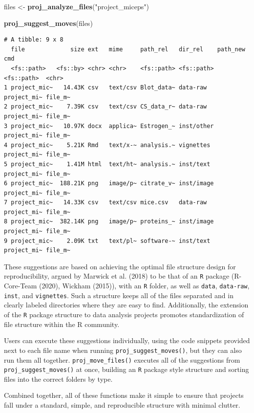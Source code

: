 \documentclass[12pt,twoside]{reedthesis}
\newenvironment{Shaded}{\begin{snugshade}}{\end{snugshade}}
\newcommand{\KeywordTok}[1]{\textcolor[rgb]{0.13,0.29,0.53}{\textbf{#1}}}
\newcommand{\StringTok}[1]{\textcolor[rgb]{0.31,0.60,0.02}{#1}}
\newcommand{\NormalTok}[1]{#1}
\begin{document}
\footnotesize
\begin{Shaded}
\begin{Highlighting}[]
\NormalTok{files <-}\StringTok{ }\KeywordTok{proj_analyze_files}\NormalTok{(}\StringTok{"project_miceps"}\NormalTok{)}

\KeywordTok{proj_suggest_moves}\NormalTok{(files)}
\end{Highlighting}
\end{Shaded}
\begin{verbatim}
# A tibble: 9 x 8
  file             size ext   mime     path_rel   dir_rel    path_new    cmd    
  <fs::path>   <fs::by> <chr> <chr>    <fs::path> <fs::path> <fs::path>  <chr>  
1 project_mic~   14.43K csv   text/csv Blot_data~ data-raw   project_mi~ file_m~
2 project_mic~    7.39K csv   text/csv CS_data_r~ data-raw   project_mi~ file_m~
3 project_mic~   10.97K docx  applica~ Estrogen_~ inst/other project_mi~ file_m~
4 project_mic~    5.21K Rmd   text/x-~ analysis.~ vignettes  project_mi~ file_m~
5 project_mic~    1.41M html  text/ht~ analysis.~ inst/text  project_mi~ file_m~
6 project_mic~  188.21K png   image/p~ citrate_v~ inst/image project_mi~ file_m~
7 project_mic~   14.33K csv   text/csv mice.csv   data-raw   project_mi~ file_m~
8 project_mic~  382.14K png   image/p~ proteins_~ inst/image project_mi~ file_m~
9 project_mic~    2.09K txt   text/pl~ software-~ inst/text  project_mi~ file_m~
\end{verbatim}
\normalsize

These suggestions are based on achieving the optimal file structure
design for reproducibility, argued by Marwick et al. (2018) to be that
of an \texttt{R} package (R-Core-Team (2020), Wickham (2015)), with an
\texttt{R} folder, as well as \texttt{data}, \texttt{data-raw},
\texttt{inst}, and \texttt{vignettes}. Such a structure keeps all of the
files separated and in clearly labeled directories where they are easy
to find. Additionally, the extension of the \texttt{R} package structure
to data analysis projects promotes standardization of file structure
within the R community.

Users can execute these suggestions individually, using the code
snippets provided next to each file name when running
\texttt{proj\_suggest\_moves()}, but they can also run them all
together. \texttt{proj\_move\_files()} executes all of the suggestions
from \texttt{proj\_suggest\_moves()} at once, building an \texttt{R}
package style structure and sorting files into the correct folders by
type.

Combined together, all of these functions make it simple to ensure that
projects fall under a standard, simple, and reproducible structure with
minimal clutter.
\end{document}
